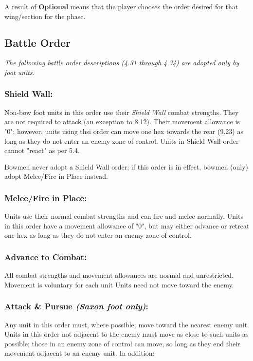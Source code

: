 \subsubsection[Optional Order]{}

A result of \textbf{Optional} means that the player chooses the order desired for that wing/section for the phase.

\subsection{Battle Order}

\textit{The following battle order descriptions (4.31 through 4.34) are adopted only by foot units.}

\subsubsection{Shield Wall:} Non-bow foot units in this order use their \textit{Shield Wall} combat strengths. They are not required to attack (an exception to 8.12). Their movement allowance is "0"; however, units using thsi order can move one hex towards the rear (9.23) as long as they do not enter an enemy zone of control. Units in Shield Wall order cannot "react" as per 5.4.

Bowmen never adopt a Shield Wall order; if this order is in effect, bowmen (only) adopt Melee/Fire in Place instead.

\subsubsection{Melee/Fire in Place:} Units use their normal combat strengths and can fire and melee normally. Units in this order have a movement allowance of "0", but may either advance or retreat one hex as long as they do not enter an enemy zone of control.

\subsubsection{Advance to Combat:} All combat strengths and movement allowances are normal and unrestricted. Movement is voluntary for each unit Units need not move toward the enemy.

\subsubsection{Attack \& Pursue \textit{(Saxon foot only)}:} Any unit in this order must, where possible, move toward the nearest enemy unit. Units in this order not adjacent to the enemy must move as close to such units as possible; those in an enemy zone of control can move, so long as they end their movement adjacent to an enemy unit. In addition:

